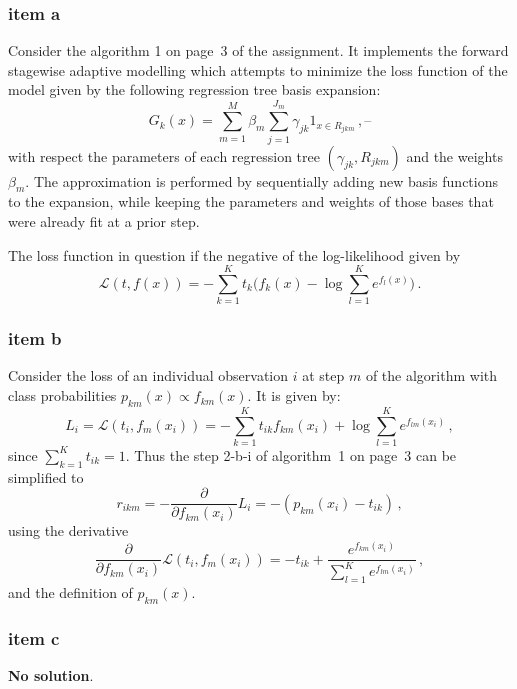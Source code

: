 \documentclass[a4paper]{article}
\newcommand{\Lcal}{\mathcal{L}}
\begin{document}
\subsubsection{item a} %
\label{ssub:item_a}

Consider the algorithm 1 on page~3 of the assignment. It implements the forward
stagewise adaptive modelling which attempts to minimize the loss function of the
model given by the following regression tree basis expansion:
\[
G_k(x) = \sum_{m=1}^M \beta_m \sum_{j=1}^{J_m} \gamma_{jk} 1_{x\in R_{jkm}}\,, \text{--}
\]
with respect the parameters of each regression tree $(\gamma_{jk}, R_{jkm})$ and
the weights $\beta_m$. The approximation is performed by sequentially adding new
basis functions to the expansion, while keeping the parameters and weights of those
bases that were already fit at a prior step.

The loss function in question if the negative of the log-likelihood given by
\[
\Lcal(t, f(x)) = - \sum_{k=1}^K t_k \bigl( f_k(x) - \log \sum_{l=1}^K e^{f_l(x)} \bigr)\,.
\]


\subsubsection{item b} %
\label{ssub:item_b}

Consider the loss of an individual observation $i$ at step $m$ of the algorithm
with class probabilities $p_{km}(x)\propto f_{km}(x)$. It is given by:
\[
L_i = \Lcal(t_i, f_m(x_i)) 
= - \sum_{k=1}^K t_{ik} f_{km}(x_i)
+ \log \sum_{l=1}^K e^{f_{lm}(x_i)}\,,
\]
since $\sum_{k=1}^K t_{ik}=1$. Thus the step 2-b-i of algorithm~1 on page~3 can be
simplified to
\[
r_{ikm} = - \frac{\partial }{\partial f_{km}(x_i)} L_i = -( p_{km}(x_i) - t_{ik} )\,,
\]
using the derivative 
\[
\frac{\partial }{\partial f_{km}(x_i)} \Lcal(t_i, f_m(x_i))
= - t_{ik} + \frac{e^{f_{km}(x_i)}}{\sum_{l=1}^K e^{f_{lm}(x_i)}}\,,
\]
and the definition of $p_{km}(x)$.


\subsubsection{item c} %
\label{ssub:item_c}

\textbf{No solution}.


\end{document}
